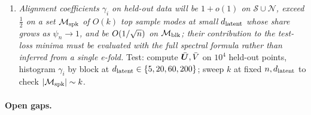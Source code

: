 \begin{enumerate}
\item \emph{Alignment coefficients $\gamma_i$ on held-out data will be $1+o(1)$ on $\mathcal S\cup\mathcal N$, exceed $\tfrac12$ on a set $\mathcal M_{\rm spk}$ of $O(k)$ top sample modes at small $d_{\mathrm{latent}}$ whose share grows as $\psi_n\to1$, and be $O(1/\sqrt{n})$ on $\mathcal M_{\rm blk}$; their contribution to the test-loss minima must be evaluated with the full spectral formula rather than inferred from a single e-fold.} Test: compute $\bar{\bm{U}},\bar V$ on $10^4$ held-out points, histogram $\gamma_i$ by block at $d_{\mathrm{latent}}\in\{5,20,60,200\}$; sweep $k$ at fixed $n,d_{\mathrm{latent}}$ to check $|\mathcal M_{\rm spk}|\sim k$.
\end{enumerate}

\paragraph{Open gaps.}
